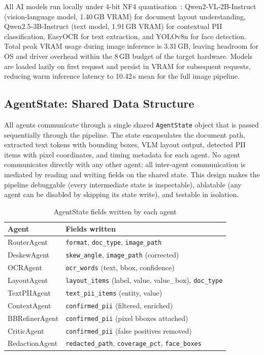 \documentclass[conference]{IEEEtran}
\begin{document}
All AI models run locally under 4-bit NF4
quantisation~\cite{dettmers2023qlora}:
Qwen2-VL-2B-Instruct (vision-language model, 1.40\,GB
VRAM) for document layout understanding,
Qwen2.5-3B-Instruct (text model, 1.91\,GB VRAM) for
contextual PII classification, EasyOCR for text
extraction, and YOLOv8n for face detection.
Total peak VRAM usage during image inference is
3.31\,GB, leaving headroom for OS and driver overhead
within the 8\,GB budget of the target hardware.
Models are loaded lazily on first request and persist
in VRAM for subsequent requests, reducing warm
inference latency to 10.42\,s mean for the full
image pipeline.

\subsection{AgentState: Shared Data Structure}

All agents communicate through a single shared
\texttt{AgentState} object that is passed sequentially
through the pipeline.
The state encapsulates the document path, extracted
text tokens with bounding boxes, VLM layout output,
detected PII items with pixel coordinates, and timing
metadata for each agent.
No agent communicates directly with any other agent;
all inter-agent communication is mediated by reading
and writing fields on the shared state.
This design makes the pipeline debuggable (every
intermediate state is inspectable), ablatable (any
agent can be disabled by skipping its state write),
and testable in isolation.

\begin{table}[h]\centering
\small
\caption{AgentState fields written by each agent}
\label{tab:agentstate}
\begin{tabular}{ll}
\toprule
Agent & Fields written \\
\midrule
RouterAgent      & \texttt{format}, \texttt{doc\_type}, \texttt{image\_path} \\
DeskewAgent      & \texttt{skew\_angle}, \texttt{image\_path} (corrected) \\
OCRAgent         & \texttt{ocr\_words} (text, bbox, confidence) \\
LayoutAgent      & \texttt{layout\_items} (label, value, value\_box), \texttt{doc\_type} \\
TextPIIAgent     & \texttt{text\_pii\_items} (entity, value) \\
ContextAgent     & \texttt{confirmed\_pii} (filtered, enriched) \\
BBRefinerAgent   & \texttt{confirmed\_pii} (pixel bboxes attached) \\
CriticAgent      & \texttt{confirmed\_pii} (false positives removed) \\
RedactionAgent   & \texttt{redacted\_path}, \texttt{coverage\_pct}, \texttt{face\_boxes} \\
\bottomrule
\end{tabular}
\end{table}
\end{document}
